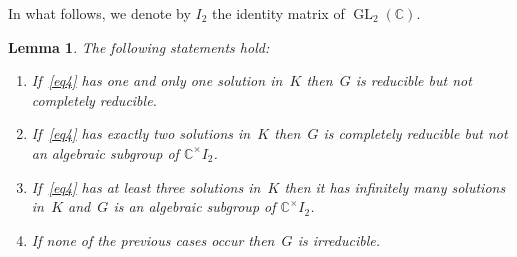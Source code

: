 \documentclass[11pt]{article}
\numberwithin{equation}{section}
\newtheorem{Lemma}[Theorem]{Lemma}
\begin{document}
In what follows, we denote by $I_{2}$ the identity matrix of $\operatorname{GL}_2(\mathbb C)$.

\begin{Lemma}
\label{lem1}
The following statements hold:
\begin{enumerate}\itemsep=0pt
\item[$1.$] If~\eqref{eq4} has one and only one solution in~$K$ then~$G$ is reducible but not completely reducible.
\item[$2.$] If~\eqref{eq4} has exactly two solutions in~$K$ then~$G$ is completely reducible but not an algebraic subgroup of
$\mathbb C^{\times} I_{2}$.
\item[$3.$] If~\eqref{eq4} has at least three solutions in~$K$ then it has infinitely many solutions in~$K$ and~$G$ is an
algebraic subgroup of $\mathbb C^{\times} I_{2}$.
\item[$4.$] If none of the previous cases occur then~$G$ is irreducible.
\end{enumerate}
\end{Lemma}
\end{document}
